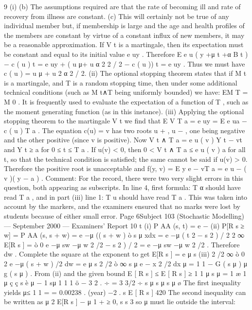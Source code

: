 \documentclass[a4paper,12pt]{article}
\begin{document}
\begin{enumerate}
9
(i)
(b) The assumptions required are that the rate of becoming ill and
rate of recovery from illness are constant.
(c) This will certainly not be true of any individual member but, if
membership is large and the age and health profiles of the
members are constant by virtue of a constant influx of new
members, it may be a reasonable approximation.
If V t is a martingale, then its expectation must be constant and equal to
its initial value e uy .
Therefore E e u ( y +μ t +α B t ) − c ( u ) t = e uy + ( u μ+ u α
2 2
/ 2 − c ( u )) t
= e uy .
Thus we must have c ( u ) = u μ + u 2 α 2 / 2.
(ii)
The optional stopping theorem states that if M t is a martingale, and T is a
random stopping time, then under some additional technical conditions
(such as M t∧T being uniformly bounded) we have:
EM T = M 0 .
It is frequently used to evaluate the expectation of a function of T , such as
the moment generating function (as in this instance).
(iii)
Applying the optional stopping theorem to the martingale V t we find that
E V T a = e uy = E e ua − c ( u ) T a .
The equation c(u) = v has two roots u + , u − , one being negative and the
other positive (since v is positive).
Now V t ∧ T a = e u ( v ) Y t − vt and Y t ≥ a for 0 ≤ t ≤ T a . If u(v) < 0, then
0 < V t ∧ T a ≤ e u ( v ) a for all t, so that the technical condition is satisfied; the
same cannot be said if u(v) > 0.
Therefore the positive root is unacceptable and f(y, v) = E y e − vT a = e u − ( v )( y − a ) .
Comment: For the record, there were two very slight errors in this question, both
appearing as subscripts. In line 4, first formula: T { α } should have read T { a } , and in part
(iii) line 1: T { u } should have read T { a } . This was taken into account by the markers, and
the examiners ensured that no marks were lost by students because of either small error.
Page 6Subject 103 (Stochastic Modelling) — September 2000 — Examiners’ Report
10
t
(i) P AA (s, t) = e −
(ii) P[R s ≥ w] = P AA (s, s + w) = e −μ (( s + w )
ò s
μ xdx
= e −μ ( t
2
− s 2 ) / 2
2
∞
E[R s ] =
ò 0
e −μ sw −μ w
2
/2
− s 2 ) / 2
= e −μ sw −μ w
2
/2
. Therefore
dw .
Complete the square at the exponent to get
E[R s ] = e μ s
(iii)
2
/2
∞
ò 0
2
e −μ ( s + w )
/2
dw = e μ s
2
/2
ò
∞
s μ
e − x
2
/2
dx
μ
=
1 1 − G ( s μ )
μ
g ( s μ )
.
From (ii) and the given bound
E [ R s ] ≤
E [ R s ] ≥
1
1
μ s μ
=
1 æ 1
μ
ç
ç s
è
μ
−
1
sμ
1
1
1 ö
− 3 2 .
÷ =
3 3/2 ÷
s μ s μ
s μ ø
The first inequality yields
μ≤
1
1
=
= 0.00238 . (year) −2 .
s E [ R s ]
420
The second inequality can be written as
μ 2 E[R s ] −
μ 1
+
≥ 0,
s s 3
so μ must lie outside the interval:

\end{enumerate}
\end{document}
